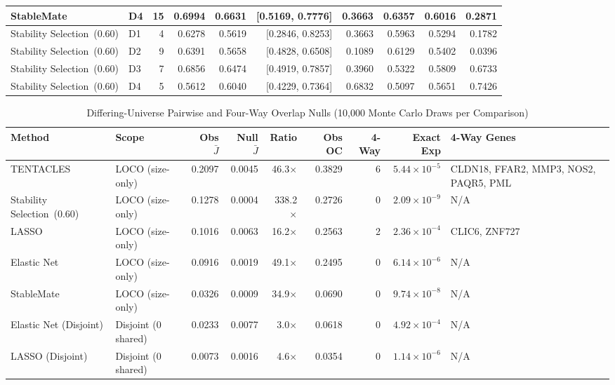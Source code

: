 \begin{table}[!htbp]
\begin{tabular}{@{}llrrrrrrrr@{}}
StableMate & D4 & 15 & 0.6994 & 0.6631 & [0.5169, 0.7776] & 0.3663 & 0.6357 & 0.6016 & 0.2871 \\
\midrule
Stability Selection\ (0.60) & D1 & 4 & 0.6278 & 0.5619 & [0.2846, 0.8253] & 0.3663 & 0.5963 & 0.5294 & 0.1782 \\
Stability Selection\ (0.60) & D2 & 9 & 0.6391 & 0.5658 & [0.4828, 0.6508] & 0.1089 & 0.6129 & 0.5402 & 0.0396 \\
Stability Selection\ (0.60) & D3 & 7 & 0.6856 & 0.6474 & [0.4919, 0.7857] & 0.3960 & 0.5322 & 0.5809 & 0.6733 \\
Stability Selection\ (0.60) & D4 & 5 & 0.5612 & 0.6040 & [0.4229, 0.7364] & 0.6832 & 0.5097 & 0.5651 & 0.7426 \\
\bottomrule
\end{tabular}
\end{table}

\clearpage
\begin{table}[!htbp]
\centering
\caption{Differing-Universe Pairwise and Four-Way Overlap Nulls (10,000 Monte Carlo Draws per Comparison)}
\label{tab:s4}
\footnotesize
\setlength{\tabcolsep}{3.2pt}
\renewcommand{\arraystretch}{1.12}
\begin{tabular}{@{}llrrrrrrl@{}}
\toprule
Method & Scope & Obs $\bar{J}$ & Null $\bar{J}$ & Ratio & Obs OC & 4-Way & Exact Exp & 4-Way Genes \\
\midrule
TENTACLES & LOCO (size-only) & 0.2097 & 0.0045 & 46.3$\times$ & 0.3829 & 6 & $5.44\times 10^{-5}$ & CLDN18, FFAR2, MMP3, NOS2, PAQR5, PML \\
Stability Selection\ (0.60) & LOCO (size-only) & 0.1278 & 0.0004 & 338.2$\times$ & 0.2726 & 0 & $2.09\times 10^{-9}$ & N/A \\
LASSO & LOCO (size-only) & 0.1016 & 0.0063 & 16.2$\times$ & 0.2563 & 2 & $2.36\times 10^{-4}$ & CLIC6, ZNF727 \\
Elastic Net & LOCO (size-only) & 0.0916 & 0.0019 & 49.1$\times$ & 0.2495 & 0 & $6.14\times 10^{-6}$ & N/A \\
StableMate & LOCO (size-only) & 0.0326 & 0.0009 & 34.9$\times$ & 0.0690 & 0 & $9.74\times 10^{-8}$ & N/A \\
Elastic Net (Disjoint) & Disjoint (0 shared) & 0.0233 & 0.0077 & 3.0$\times$ & 0.0618 & 0 & $4.92\times 10^{-4}$ & N/A \\
LASSO (Disjoint) & Disjoint (0 shared) & 0.0073 & 0.0016 & 4.6$\times$ & 0.0354 & 0 & $1.14\times 10^{-6}$ & N/A \\
\bottomrule
\end{tabular}
\end{table}

